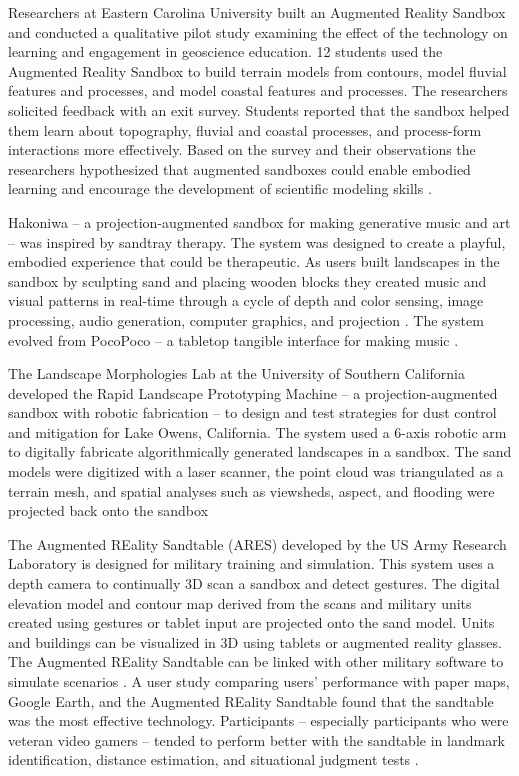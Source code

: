 \documentclass[prodmode,acmtochi]{acmsmall} %
\begin{document}
Researchers at Eastern Carolina University
built an Augmented Reality Sandbox 
and conducted a qualitative pilot study
examining the effect of the technology
on learning and engagement 
in geoscience education.
12 students used the Augmented Reality Sandbox 
to build terrain models from contours,
model fluvial features and processes, and
model coastal features and processes. 
The researchers solicited feedback 
with an exit survey. 
Students reported that the sandbox helped them learn 
about topography, fluvial and coastal processes, 
and process-form interactions 
more effectively.
Based on the survey and their observations
the researchers hypothesized that augmented sandboxes
could enable embodied learning
and encourage the development of 
scientific modeling skills \cite{Woods2016}. 

Hakoniwa -- a projection-augmented sandbox 
for making generative music and art -- 
was inspired by sandtray therapy. 
The system was designed to 
create a playful, embodied experience 
that could be therapeutic. 
As users built landscapes in the sandbox
by sculpting sand and placing wooden blocks
they created music and visual patterns 
in real-time through a cycle of depth and color sensing, 
image processing, audio generation, computer graphics, 
and projection \cite{Kikukawa2013}. 
The system evolved from PocoPoco 
-- a tabletop tangible interface for making music \cite{Kanai2011}. 

The Landscape Morphologies Lab
at the University of Southern California developed the 
Rapid Landscape Prototyping Machine
-- a projection-augmented sandbox with robotic fabrication --
to design and test strategies for dust control and mitigation
for Lake Owens, California. 
The system used a 6-axis robotic arm 
to digitally fabricate algorithmically generated 
landscapes in a sandbox. 
The sand models were digitized with a laser scanner,
the point cloud was triangulated as a terrain mesh,
and spatial analyses such as 
viewsheds, aspect, and flooding
were projected back onto the sandbox \cite{Robinson2014,Cantrell2016}

The Augmented REality Sandtable (ARES) 
developed by the US Army Research Laboratory
is designed for military training and simulation. 
This system uses a depth camera to continually
3D scan a sandbox and detect gestures.
The digital elevation model and contour map derived from the scans 
and military units created using gestures or tablet input
are projected onto the sand model. 
Units and buildings can be visualized in 3D using 
tablets or augmented reality glasses. 
The Augmented REality Sandtable 
can be linked with other military software 
to simulate scenarios 
\cite{Amburn2015}.
A user study comparing users' performance with 
paper maps, Google Earth, and the Augmented REality Sandtable 
found that the sandtable was the most effective technology.
Participants 
-- especially participants who were veteran video gamers --
tended to perform better with the sandtable in
landmark identification, distance estimation, and situational judgment
tests \cite{SchmidtDaly2016}.
\end{document}
